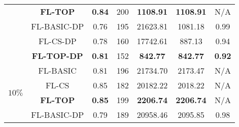 \documentclass[accepted]{uai2021} %
\begin{document}
\begin{table*}[!ht]
\begin{minipage}{.5\linewidth}
{\begin{tabular}{|c|c|c|c|c|c|c|}
        &  \textbf{FL-TOP}   & \textbf{0.84}  & 200 & \textbf{1108.91} & \textbf{1108.91} & N/A \\
        \cline{2-7}
        \cline{2-7}
        &  FL-BASIC-DP   &  0.76  & 195 & 21623.81 & 1081.18 & 0.99 \\
        \cline{2-7}
        &  FL-CS-DP  &  0.78  & 160 & 17742.61 & 887.13 & 0.94 \\
        \cline{2-7}
        &  \textbf{FL-TOP-DP}   &  \textbf{0.81} & 152 & \textbf{842.77}  & \textbf{842.77} & \textbf{0.92}\\
        \hline 
        \hline
        \multirow{8}{*}{$10\%$} &  FL-BASIC   &  0.81  & 196 & 21734.70 & 2173.47 &N/A  \\
        \cline{2-7}
        &  FL-CS  &  0.85  & 182 & 20182.22 & 2018.22 & N/A  \\
        \cline{2-7}
        &  \textbf{FL-TOP}   & \textbf{0.85}  & 199 & \textbf{2206.74} & \textbf{2206.74} &N/A \\
        \cline{2-7}
        \cline{2-7}
        &  FL-BASIC-DP   &  0.79  & 189 & 20958.46 & 2095.85 & 0.98\\
        \cline{2-7}

\end{tabular}}
\end{minipage}
\end{table*}
\end{document}
